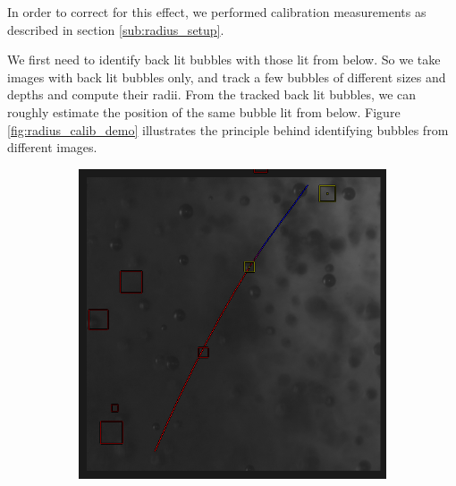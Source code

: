 			In order to correct for this effect, we performed calibration measurements as described in section \ref{sub:radius_setup}.
			
			We first need to identify back lit bubbles with those lit from below. So we take images with back lit bubbles only, and track a few bubbles of different sizes and depths and compute their radii. From the tracked back lit bubbles, we can roughly estimate the position of the same bubble lit from below. Figure \ref{fig:radius_calib_demo} illustrates the principle behind identifying bubbles from different images. 
			
			\begin{figure}	
				\centering
				\begin{subfigure}[t]{.4\textwidth}
					\centering
					\includegraphics[scale=0.45]{images/tracking_green.png}
					\caption{}
					\label{subfig:green_1}
				\end{subfigure}\hfill
				\begin{subfigure}[t]{.4\textwidth}
					\centering

\end{subfigure}
\end{figure}
